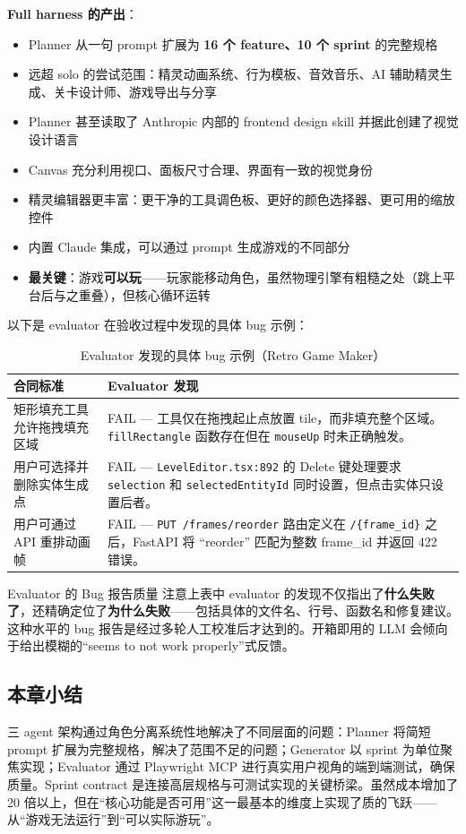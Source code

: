 \textbf{Full harness 的产出}：
\begin{itemize}[leftmargin=1.5em]
    \item Planner 从一句 prompt 扩展为 \textbf{16 个 feature、10 个 sprint} 的完整规格
    \item 远超 solo 的尝试范围：精灵动画系统、行为模板、音效音乐、AI 辅助精灵生成、关卡设计师、游戏导出与分享
    \item Planner 甚至读取了 Anthropic 内部的 frontend design skill 并据此创建了视觉设计语言
    \item Canvas 充分利用视口、面板尺寸合理、界面有一致的视觉身份
    \item 精灵编辑器更丰富：更干净的工具调色板、更好的颜色选择器、更可用的缩放控件
    \item 内置 Claude 集成，可以通过 prompt 生成游戏的不同部分
    \item \textbf{最关键}：游戏\textbf{可以玩}——玩家能移动角色，虽然物理引擎有粗糙之处（跳上平台后与之重叠），但核心循环运转
\end{itemize}

以下是 evaluator 在验收过程中发现的具体 bug 示例：

\begin{table}[H]
\centering
\small
\renewcommand{\arraystretch}{1.3}
\begin{tabular}{p{4cm}p{9cm}}
\toprule
\textbf{合同标准} & \textbf{Evaluator 发现} \\
\midrule
矩形填充工具允许拖拽填充区域 & FAIL --- 工具仅在拖拽起止点放置 tile，而非填充整个区域。\texttt{fillRectangle} 函数存在但在 \texttt{mouseUp} 时未正确触发。 \\
\midrule
用户可选择并删除实体生成点 & FAIL --- \texttt{LevelEditor.tsx:892} 的 Delete 键处理要求 \texttt{selection} 和 \texttt{selectedEntityId} 同时设置，但点击实体只设置后者。 \\
\midrule
用户可通过 API 重排动画帧 & FAIL --- \texttt{PUT /frames/reorder} 路由定义在 \texttt{/\{frame\_id\}} 之后，FastAPI 将 ``reorder'' 匹配为整数 frame\_id 并返回 422 错误。 \\
\bottomrule
\end{tabular}
\caption{Evaluator 发现的具体 bug 示例（Retro Game Maker）}
\end{table}

\begin{knowledgebox}{Evaluator 的 Bug 报告质量}
注意上表中 evaluator 的发现不仅指出了\textbf{什么失败了}，还精确定位了\textbf{为什么失败}——包括具体的文件名、行号、函数名和修复建议。这种水平的 bug 报告是经过多轮人工校准后才达到的。开箱即用的 LLM 会倾向于给出模糊的``seems to not work properly''式反馈。
\end{knowledgebox}

\subsection{本章小结}

三 agent 架构通过角色分离系统性地解决了不同层面的问题：Planner 将简短 prompt 扩展为完整规格，解决了范围不足的问题；Generator 以 sprint 为单位聚焦实现；Evaluator 通过 Playwright MCP 进行真实用户视角的端到端测试，确保质量。Sprint contract 是连接高层规格与可测试实现的关键桥梁。虽然成本增加了 20 倍以上，但在``核心功能是否可用''这一最基本的维度上实现了质的飞跃——从``游戏无法运行''到``可以实际游玩''。


